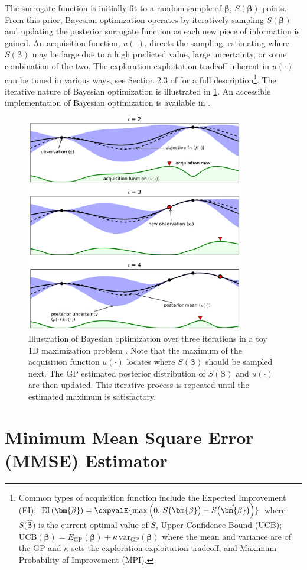 The surrogate function is initially fit to
a random sample of $\bm{\beta}$, $S\left(\bm{\beta}\right)$ points.
From this prior, Bayesian optimization
operates by iteratively sampling $S\left(\bm{\beta}\right)$ and updating
the posterior surrogate function as each new piece of information is gained.
An acquisition function, $u\left(\cdot\right)$, directs the sampling,
estimating where $S\left(\bm{\beta}\right)$ may be large
due to a high predicted value, large uncertainty, or some combination of the two.
The exploration-exploitation tradeoff inherent in $u\left(\cdot\right)$
can be tuned in various ways, see Section 2.3 of \cite{Brochu2010} for a full description\footnote{Common types of acquisition function include the
Expected Improvement (EI);
$\text{EI}\left(\bm{\beta}\right) = \expvalE{\max\left(0,\,S\big(\bm{\beta}\big) - S\big(\hat{\bm{\beta}}\big)\right)}$
where $S\big(\hat{\bm{\beta}}\big)$ is the current optimal value of $S$,
Upper Confidence Bound (UCB);
$\text{UCB}\left(\bm{\beta}\right) = E_{\text{GP}} \left(\bm{\beta}\right) + \kappa\,\text{var}_{\text{GP}} \left(\bm{\beta}\right)$ where the mean and variance are of the GP and $\kappa$ sets the exploration-exploitation tradeoff,
and Maximum Probability of Improvement (MPI).}.
The iterative nature of Bayesian optimization is illustrated in \cref{fig:BO_ex}.
An accessible implementation of Bayesian optimization is available in \skopt \cite{scikit-optimize,Borisyak}.

\begin{figure}[H] %
\centering
\includegraphics[width=0.85\textwidth]{figures/ml/toyGPtext3}
\caption{
Illustration of Bayesian optimization over three iterations in a toy 1D maximization problem \cite{Brochu2010}.
Note that the maximum of the acquisition function $u\left(\cdot\right)$
locates where $S\left(\bm{\beta}\right)$ should be sampled next.
The GP estimated posterior distribution of $S\left(\bm{\beta}\right)$
and $u\left(\cdot\right)$ are then updated.
This iterative process is repeated until the estimated maximum is satisfactory.
}
\label{fig:BO_ex}
\end{figure}

\section{Minimum Mean Square Error (MMSE) Estimator}
\label{opt:BO:MMSE}

